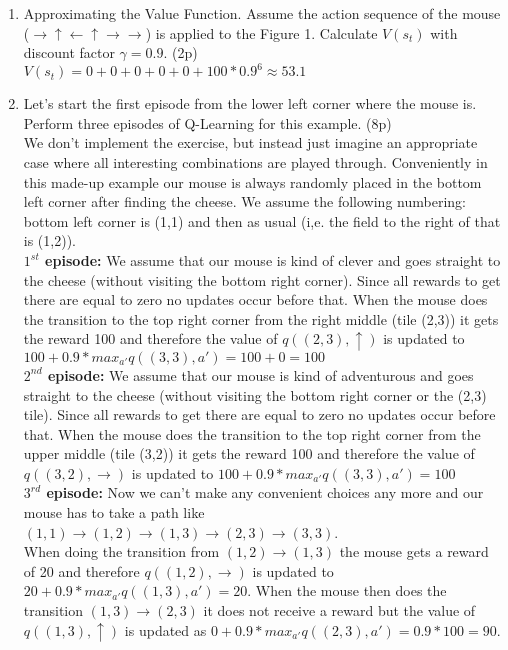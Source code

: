 \documentclass{article}
\begin{document}
\begin{enumerate}
	\item Approximating the Value Function. Assume the action sequence of the mouse ($\rightarrow \uparrow \leftarrow \uparrow \rightarrow \rightarrow$) is applied to the Figure 1.
Calculate $V(s_t)$ with discount factor $\gamma = 0.9.$ (2p) \\
	$V(s_t) = 0+0+0+0+0+100*0.9^{6} \approx 53.1$
	\item  Let's start the first episode from the lower left corner where the mouse is. Perform
three episodes of Q-Learning for this example. (8p) \\
	We don't implement the exercise, but instead just imagine an appropriate case where all interesting combinations are played through. Conveniently in this made-up example our mouse is always randomly placed in the bottom left corner after finding the cheese. We assume the following numbering: bottom left corner is (1,1) and then as usual (i,e. the field to the right of that is (1,2)).\\
	\textbf{$1^{st}$ episode:} We assume that our mouse is kind of clever and goes straight to the cheese (without visiting the bottom right corner). Since all rewards to get there are equal to zero no updates occur before that. When the mouse does the transition to the top right corner from the right middle (tile (2,3)) it gets the reward 100 and therefore the value of $q((2,3),\uparrow)$ is updated to $100 + 0.9 * max_{a'} q((3,3),a') = 100 + 0 = 100$ \\
	\textbf{$2^{nd}$ episode:} We assume that our mouse is kind of adventurous and goes straight to the cheese (without visiting the bottom right corner or the (2,3) tile). Since all rewards to get there are equal to zero no updates occur before that. When the mouse does the transition to the top right corner from the upper middle (tile (3,2)) it gets the reward 100 and therefore the value of $q((3,2),\rightarrow)$ is updated to $100 + 0.9 * max_{a'} q((3,3),a') = 100$ \\
	\textbf{$3^{rd}$ episode:} Now we can't make any convenient choices any more and our mouse has to take a path like $(1,1) \to (1,2) \to (1,3) \to (2,3) \to (3,3)$. \\
	When doing the transition from $(1,2) \to (1,3)$ the mouse gets a reward of 20 and therefore $q((1,2),\rightarrow)$ is updated to $20 + 0.9 * max_{a'} q((1,3),a') = 20$. When the mouse then does the transition $(1,3) \to (2,3)$ it does not receive a reward but the value of $q((1,3),\uparrow)$ is updated as $0 + 0.9 * max_{a'} q((2,3),a') = 0.9 * 100 = 90$.
\end{enumerate}
\end{document}
